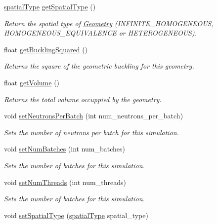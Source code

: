\begin{DoxyCompactItemize}
\hyperlink{Geometry_8h_af321382c4a8d9fdb71c83382f82fac00}{spatial\-Type} \hyperlink{classGeometry_ac64b1e5ebf43a9538952b20eaf07ef3b}{get\-Spatial\-Type} ()
\begin{DoxyCompactList}\small\item\em Return the spatial type of \hyperlink{classGeometry}{Geometry} (I\-N\-F\-I\-N\-I\-T\-E\-\_\-\-H\-O\-M\-O\-G\-E\-N\-E\-O\-U\-S, H\-O\-M\-O\-G\-E\-N\-E\-O\-U\-S\-\_\-\-E\-Q\-U\-I\-V\-A\-L\-E\-N\-C\-E or H\-E\-T\-E\-R\-O\-G\-E\-N\-E\-O\-U\-S). \end{DoxyCompactList}\item 
float \hyperlink{classGeometry_a662e458bc59ac8390e0c07cea3ab0be8}{get\-Buckling\-Squared} ()
\begin{DoxyCompactList}\small\item\em Returns the square of the geometric buckling for this geometry. \end{DoxyCompactList}\item 
float \hyperlink{classGeometry_a982427d7ad500c703b5348f455b7dced}{get\-Volume} ()
\begin{DoxyCompactList}\small\item\em Returns the total volume occuppied by the geometry. \end{DoxyCompactList}\item 
void \hyperlink{classGeometry_a0160e8eef8ecd7655dc2ddc8f7a46391}{set\-Neutrons\-Per\-Batch} (int num\-\_\-neutrons\-\_\-per\-\_\-batch)
\begin{DoxyCompactList}\small\item\em Sets the number of neutrons per batch for this simulation. \end{DoxyCompactList}\item 
void \hyperlink{classGeometry_ab78e778d1362e38dd9e02514e7ee7019}{set\-Num\-Batches} (int num\-\_\-batches)
\begin{DoxyCompactList}\small\item\em Sets the number of batches for this simulation. \end{DoxyCompactList}\item 
void \hyperlink{classGeometry_a657cb04b0e42bc9a1574a9120c5a6e67}{set\-Num\-Threads} (int num\-\_\-threads)
\begin{DoxyCompactList}\small\item\em Sets the number of batches for this simulation. \end{DoxyCompactList}\item 
void \hyperlink{classGeometry_a52ab88674bf4f90db4fab0899f326a58}{set\-Spatial\-Type} (\hyperlink{Geometry_8h_af321382c4a8d9fdb71c83382f82fac00}{spatial\-Type} spatial\-\_\-type)

\end{DoxyCompactItemize}
